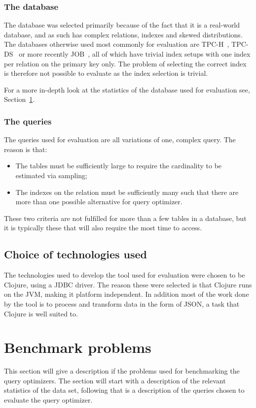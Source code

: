 \subsubsection{The database}
The database was selected primarily because of the fact that it is a real-world
database, and as such has complex relations, indexes and skewed distributions.
The databases otherwise used most commonly for evaluation are
TPC-H~\cite{tpc_th}, TPC-DS~\cite{tpc_tha} or more recently
JOB~\cite{leis_2015_how_hgaqor}, all of which have trivial index setups with
one index per relation on the primary key only. The problem of selecting the
correct index is therefore not possible to evaluate as the index selection is
trivial.

For a more in-depth look at the statistics of the database used for evaluation
see, Section~\ref{sec:benchmark}.

\subsubsection{The queries}
The queries used for evaluation are all variations of one, complex query. The
reason is that:
\begin{itemize}
\item The tables must be sufficiently large to require the cardinality to be
  estimated via sampling;
\item The indexes on the relation must be sufficiently many such that there are
  more than one possible alternative for query optimizer.
\end{itemize}

These two criteria are not fulfilled for more than a few tables in a database,
but it is typically these that will also require the most time to access.

\subsection{Choice of technologies used}
The technologies used to develop the tool used for evaluation were chosen to be
Clojure, using a JDBC driver. The reason these were selected is that Clojure
runs on the JVM, making it platform independent. In addition most of the work
done by the tool is to process and transform data in the form of JSON, a task
that Clojure is well suited to.

\section{Benchmark problems}\label{sec:benchmark}
This section will give a description if the problems used for benchmarking the
query optimizers. The section will start with a description of the relevant
statistics of the data set, following that is a description of the queries
chosen to evaluate the query optimizer.

